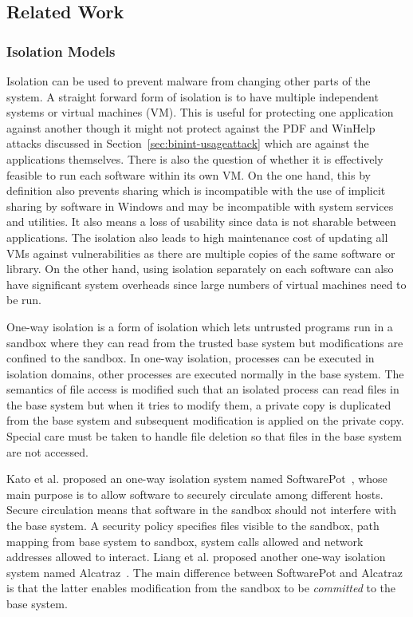 \subsection{Related Work}
\label{sec:binint-prevworks}


\subsubsection{Isolation Models}

Isolation can be used to prevent malware from changing
other parts of the system.
A straight forward form of isolation is to have 
multiple independent systems or virtual machines (VM).
This is useful for protecting one application against another though
it might not protect against the PDF and WinHelp attacks discussed in
Section~\ref{sec:binint-usageattack} which are against the applications themselves.
There is also the question of whether it is effectively feasible to 
run each software within its own VM.
On the one hand,
this by definition also prevents sharing which is incompatible
with the use of implicit sharing by software in Windows and
may be incompatible with system services and utilities.
It also means a loss of usability since data is not sharable
between applications.
The isolation also leads to high
maintenance cost of updating all VMs against
vulnerabilities as there are multiple copies of
the same software or library.
On the other hand, using isolation separately on each software can also
have significant system overheads since large numbers of virtual machines
need to be run.

One-way isolation is a form of isolation which
lets untrusted programs run in a sandbox where they can read from the
trusted base system but modifications are confined to the sandbox.
In one-way isolation, processes can be executed in isolation domains,
other processes are executed normally in the base system.
The semantics of file access is modified such that an isolated process
can read files in the base system but when it tries to modify them,
a private copy is duplicated from the base system and subsequent modification
is applied on the private copy.
Special care must be taken to handle file deletion so that files in the
base system are not accessed.

Kato et al. proposed an one-way isolation system named
SoftwarePot~\cite{kato2003softwarepot},
whose main purpose is to allow software to securely circulate among
different hosts.
Secure circulation means that software in the sandbox should not interfere
with the base system.
A security policy specifies files visible to the sandbox,
path mapping from base system to sandbox, system calls allowed and
network addresses allowed to interact.
Liang et al. proposed another one-way isolation system named
Alcatraz~\cite{liang2009alcatraz}.
The main difference between SoftwarePot and Alcatraz is that the latter
enables modification from the sandbox to be {\em committed} to the base
system.


